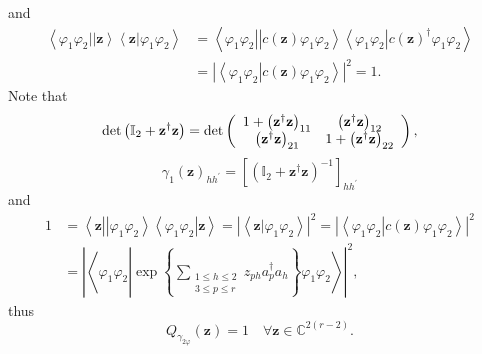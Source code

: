 \documentclass[aps,preprint]{revtex4}%
\begin{document}
and%
\begin{align}
\left\langle \varphi_{1}\varphi_{2}\left\vert \left\vert \mathbf{z}%
\right\rangle \left\langle \mathbf{z}\right\vert \right.  \varphi_{1}%
\varphi_{2}\right\rangle  &  =\left\langle \varphi_{1}\varphi_{2}\left\vert
\left\vert c\left(  \mathbf{z}\right)  \varphi_{1}\varphi_{2}\right\rangle
\left\langle \varphi_{1}\varphi_{2}\right\vert \right.  c\left(
\mathbf{z}\right)  ^{\dagger}\varphi_{1}\varphi_{2}\right\rangle \nonumber\\
&  =\left\vert \left\langle \varphi_{1}\varphi_{2}\left\vert c\left(
\mathbf{z}\right)  \varphi_{1}\varphi_{2}\right.  \right\rangle \right\vert
^{2}=1.
\end{align}
Note that%
\begin{equation}
\det\left(  \mathbb{I}_{2}+\mathbf{z}^{\dagger}\mathbf{z}\right)  =\det\left(
%
\begin{array}
[c]{cc}%
1+\left(  \mathbf{z}^{\dagger}\mathbf{z}\right)  _{11} & \left(
\mathbf{z}^{\dagger}\mathbf{z}\right)  _{12}\\
\left(  \mathbf{z}^{\dagger}\mathbf{z}\right)  _{21} & 1+\left(
\mathbf{z}^{\dagger}\mathbf{z}\right)  _{22}%
\end{array}
\right)  ,
\end{equation}%
\begin{equation}
\gamma_{1}\left(  \mathbf{z}\right)  _{hh^{\prime}}=\left[  \left(
\mathbb{I}_{2}+\mathbf{z}^{\dagger}\mathbf{z}\right)  ^{-1}\right]
_{hh^{\prime}}%
\end{equation}
and
\begin{align}
1 &  =\left\langle \mathbf{z}\left\vert \left\vert \varphi_{1}\varphi
_{2}\right\rangle \left\langle \varphi_{1}\varphi_{2}\right\vert \right.
\mathbf{z}\right\rangle =\left\vert \left\langle \left.  \mathbf{z}\right\vert
\varphi_{1}\varphi_{2}\right\rangle \right\vert ^{2}=\left\vert \left\langle
\left.  \varphi_{1}\varphi_{2}\right\vert c\left(  \mathbf{z}\right)
\varphi_{1}\varphi_{2}\right\rangle \right\vert ^{2}\nonumber\\
&  =\left\vert \left\langle \varphi_{1}\varphi_{2}\left\vert \exp\left\{
\sum\limits_{\substack{1\leq h\leq2\\3\leq p\leq r}}z_{ph}a_{p}^{\dagger}%
a_{h}\right\}  \varphi_{1}\varphi_{2}\right.  \right\rangle \right\vert ^{2},
\end{align}
thus
\begin{equation}
Q_{\gamma_{2\varphi}}\left(  \mathbf{z}\right)  =1\quad\forall\mathbf{z\in
}\mathbb{C}^{2\left(  r-2\right)  }.
\end{equation}
\end{document}
